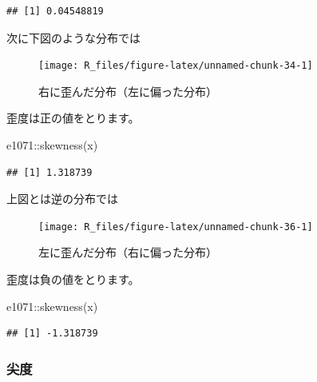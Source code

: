 \documentclass[
  12pt,
]{book}
\newenvironment{Shaded}{\begin{snugshade}}{\end{snugshade}}
\newcommand{\FunctionTok}[1]{\textcolor[rgb]{0.00,0.00,0.00}{#1}}
\newcommand{\NormalTok}[1]{#1}
\newcommand{\SpecialCharTok}[1]{\textcolor[rgb]{0.00,0.00,0.00}{#1}}
\begin{document}
\begin{verbatim}
## [1] 0.04548819
\end{verbatim}

次に下図のような分布では

\begin{figure}[H]

{\centering \texttt{[image: R\_files/figure-latex/unnamed-chunk-34-1]} 

}

\caption{右に歪んだ分布（左に偏った分布）}\label{fig:unnamed-chunk-34}
\end{figure}

歪度は正の値をとります。

\begin{Shaded}
\begin{Highlighting}[numbers=left,,]
\NormalTok{e1071}\SpecialCharTok{::}\FunctionTok{skewness}\NormalTok{(x)}
\end{Highlighting}
\end{Shaded}

\begin{verbatim}
## [1] 1.318739
\end{verbatim}

上図とは逆の分布では

\begin{figure}[H]

{\centering \texttt{[image: R\_files/figure-latex/unnamed-chunk-36-1]} 

}

\caption{左に歪んだ分布（右に偏った分布）}\label{fig:unnamed-chunk-36}
\end{figure}

歪度は負の値をとります。

\begin{Shaded}
\begin{Highlighting}[numbers=left,,]
\NormalTok{e1071}\SpecialCharTok{::}\FunctionTok{skewness}\NormalTok{(x)}
\end{Highlighting}
\end{Shaded}

\begin{verbatim}
## [1] -1.318739
\end{verbatim}

\hypertarget{ux5c16ux5ea6}{%
\subsubsection{尖度}\label{ux5c16ux5ea6}}
\end{document}
